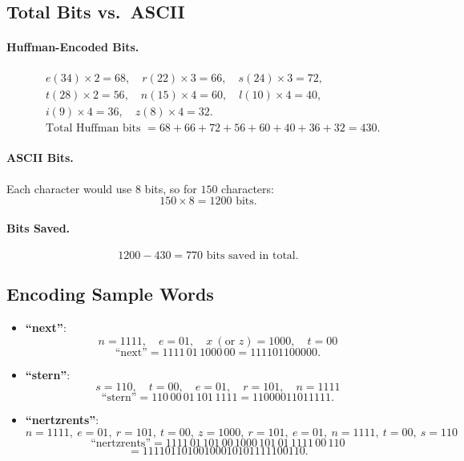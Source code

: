 \documentclass{article}
\begin{document}
\subsection*{Total Bits vs.\ ASCII}

\paragraph{Huffman-Encoded Bits.}
\[
\begin{aligned}
& e(34)\times2 = 68, \quad
r(22)\times3 = 66, \quad
s(24)\times3 = 72, \\
& t(28)\times2 = 56, \quad
n(15)\times4 = 60, \quad
l(10)\times4 = 40, \\
& i(9)\times4 = 36, \quad
z(8)\times4 = 32. \\
& \text{Total Huffman bits } = 68 + 66 + 72 + 56 + 60 + 40 + 36 + 32 = 430.
\end{aligned}
\]

\paragraph{ASCII Bits.}
Each character would use $8$ bits, so for $150$ characters:
\[
150 \times 8 = 1200 \text{ bits}.
\]

\paragraph{Bits Saved.}
\[
1200 - 430 = 770 \text{ bits saved in total}.
\]

\subsection*{Encoding Sample Words}

\begin{itemize}
  \item \textbf{``next''}:
  \[
  n = 1111,\quad e = 01,\quad x\ (\text{or }z)=1000,\quad t=00
  \]
  \[
  \text{``next''} = 1111\,01\,1000\,00 = 111101100000.
  \]

  \item \textbf{``stern''}:
  \[
  s = 110,\quad t = 00,\quad e = 01,\quad r = 101,\quad n = 1111
  \]
  \[
  \text{``stern''} = 110\,00\,01\,101\,1111 = 11000011011111.
  \]

  \item \textbf{``nertzrents''}:
  \[
  n=1111,\ e=01,\ r=101,\ t=00,\ z=1000,\ r=101,\ e=01,\ n=1111,\ t=00,\ s=110
  \]
  \[
  \text{``nertzrents''} = 1111\,01\,101\,00\,1000\,101\,01\,1111\,00\,110
  \]
  \[
  = 11110110100100010101111100110.
  \]
\end{itemize}
\end{document}
